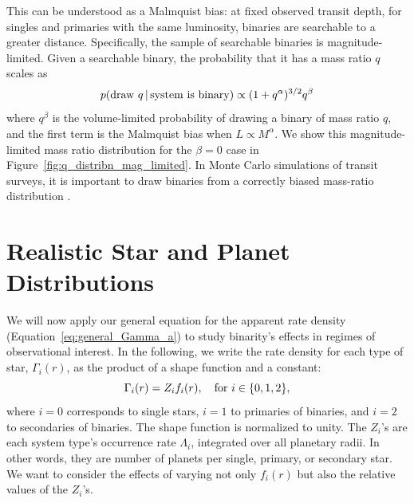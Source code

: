 \documentclass[12pt,modern]{aastex61}
\begin{document}
This can be understood as a Malmquist bias: at fixed observed transit 
depth, for singles and primaries with the same luminosity, binaries are 
searchable to a greater distance.
Specifically, the sample of searchable binaries is magnitude-limited.
Given a searchable binary, the probability that it has a mass ratio $q$ 
scales as
\begin{equation}
p({\rm draw\ }q\,|\,{\rm system\ is\ binary}) \propto 
(1+q^\alpha)^{3/2} q^\beta 
\label{eq:Malmquist_bias}
\end{equation}
where $q^\beta$ is the volume-limited probability of drawing a binary of mass 
ratio $q$, and the first term is the Malmquist bias when $L\propto M^\alpha$.
We show this magnitude-limited mass ratio distribution for the $\beta=0$ case 
in Figure~\ref{fig:q_distribn_mag_limited}.
In Monte Carlo simulations of transit surveys, it is 
important to draw binaries from a correctly biased mass-ratio distribution 
\citep[\textit{e.g.},][]{bakos_hatsouth:_2013,sullivan_transiting_2015,
    gunther_new_2017}.



%

\section{Realistic Star and Planet Distributions}
\label{sec:more_complicated}
We will now apply our general equation for the apparent rate 
density (Equation~\ref{eq:general_Gamma_a}) to study binarity's effects in 
regimes of observational interest.
In the following, we write the rate density for each type of star, 
$\Gamma_i(r)$, as the product of a shape function and a constant:
\begin{equation}
\Gamma_i(r) = Z_i f_i(r), \quad {\rm for\ }i\in\{0,1,2\},
\end{equation}
where $i=0$ corresponds to single stars, $i=1$ to primaries of 
binaries, and $i=2$ to secondaries of binaries.
The shape function is normalized to unity.
The $Z_i$'s are each system type's occurrence rate $\Lambda_i$, integrated 
over all planetary radii. In other words, they are number of planets per 
single, primary, or secondary star.
We want to consider the effects of varying not only $f_i(r)$ but also the
relative values of the $Z_i$'s.

\end{document}
